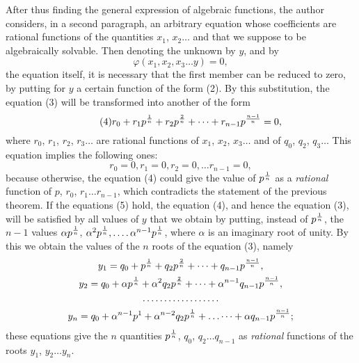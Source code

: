 \documentclass[oneside, 12 pt, leqno]{memoir}
\let\oldfrac\frac
\def\frac#1#2{\mathchoice{\text{\scalebox{.83}{${\oldfrac{#1}{#2}}$}}}{\text{\scalebox{.83}{${\displaystyle\oldfrac{#1}{#2}}$}}}{\genfrac{}{}{}{2}{#1}{#2}}{\genfrac{}{}{}{3}{#1}{#2}}}
\begin{document}
After thus finding the general expression of algebraic functions, the author considers, in a second paragraph, an arbitrary equation whose coefficients are rational functions of the quantities \(x_1\), \(x_2 \dots\) and that we suppose to be algebraically solvable. Then denoting the unknown by \(y\), and by
\[\tag{3}\varphi\left(x_1, x_2, x_3 \dots y\right)=0,\]
the equation itself, it is necessary that the first member can be reduced to zero, by putting for \(y\) a certain function of the form (2). By this substitution, the equation (3) will be transformed into another of the form
\[\tag{4}r_0+r_1 p^{\frac{1}{n}}+r_2 p^{\frac{2}{n}}+\dots+r_{n-1} p^{\frac{n-1}{n}}=0,\]
where \(r_0\), \(r_1\), \(r_2\), \(r_3 \dots\) are rational functions of \(x_1\), \(x_2\), \(x_3 \dots\) and of \(q_0\), \(q_2\), \(q_3 \dots\) This equation implies the following ones:
\[\tag{5}r_0=0, r_1=0, r_2=0, \dots r_{n-1}=0,\]
because otherwise, the equation (4) could give the value of \(p^{\frac{1}{n}}\) as a \textit{rational} function of \(p\), \(r_0\), \(r_1 \dots r_{n-1}\), which contradicts the statement of the previous theorem. If the equations (5) hold, the equation (4), and hence the equation (3), will be satisfied by all values of \(y\) that we obtain by putting, instead of \(p^{\frac{1}{n}}\), the \(n-1\) values \(\alpha p^{\frac{1}{n}}\), \(\alpha^2 p^{\frac{1}{n}}, .\dots \alpha^{n-1} p^{\frac{1}{n}}\), where \(\alpha\) is an imaginary root of unity. By this we obtain the values of the \(n\) roots of the equation (3), namely
\[\begin{gathered}
y_1=q_0+p^{\frac{1}{n}}+q_2 p^{\frac{2}{n}}+\dots+q_{n-1} p^{\frac{n-1}{n}}, \\
y_2=q_0+\alpha p^{\frac{1}{n}}+\alpha^2 q_2 p^{\frac{2}{n}}+\dots+\alpha^{n-1} q_{n-1} p^{\frac{n-1}{n}}, \\
\dots \dots \dots \dots \dots \dots \\
y_n=q_0+\alpha^{n-1} p^1+\alpha^{n-2} q_2 p^{\frac{1}{n}}+\dots \dots+\alpha q_{n-1} p^{\frac{n-1}{n}};
\end{gathered}\]
these equations give the \(n\) quantities \(p^{\frac{1}{n}}\), \(q_0\), \(q_2 \dots q_{n-1}\) as \textit{rational} functions of the roots \(y_1\), \(y_2 \dots y_n\).
\end{document}
